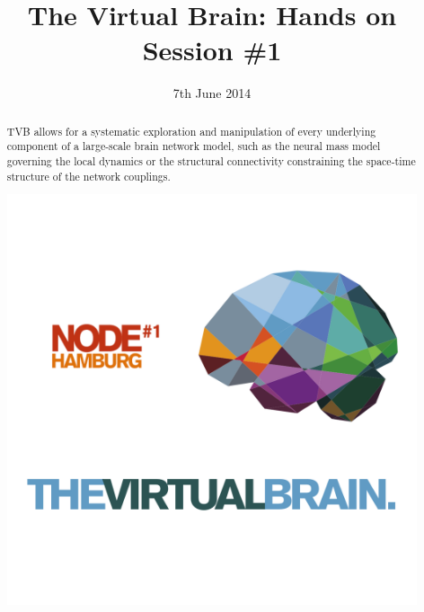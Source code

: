 \documentclass{tufte-handout}
\title{The Virtual Brain: Hands on Session \#1}
\date{7th June 2014}
\begin{document}
\maketitle %

\begin{abstract}

\noindent TVB allows for a systematic exploration and manipulation of every
underlying component of a large-scale brain network model, such as the neural
mass model governing the local dynamics or the structural connectivity
constraining the space-time structure of the network couplings.
\begin{marginfigure}%
  \includegraphics[width=\linewidth]{tvb_logo_transparent_square}
  \label{fig:marginfig}
\end{marginfigure}
\end{abstract}


\end{document}
